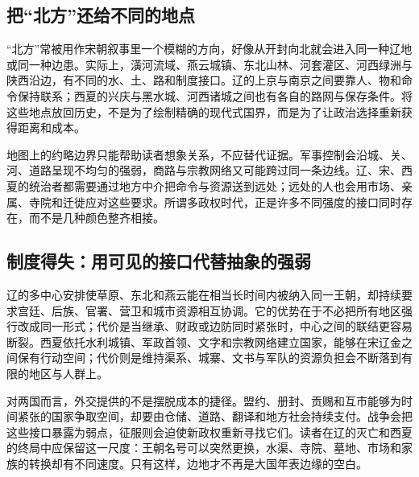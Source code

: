 \subsection{把“北方”还给不同的地点}

“北方”常被用作宋朝叙事里一个模糊的方向，好像从开封向北就会进入同一种辽地或同一种边患。实际上，潢河流域、燕云城镇、东北山林、河套灌区、河西绿洲与陕西沿边，有不同的水、土、路和制度接口。辽的上京与南京之间要靠人、物和命令保持联系；西夏的兴庆与黑水城、河西诸城之间也有各自的路网与保存条件。将这些地点放回历史，不是为了绘制精确的现代式国界，而是为了让政治选择重新获得距离和成本。

地图上的约略边界只能帮助读者想象关系，不应替代证据。军事控制会沿城、关、河、道路呈现不均匀的强弱，商路与宗教网络又可能跨过同一条边线。辽、宋、西夏的统治者都需要通过地方中介把命令与资源送到远处；远处的人也会用市场、亲属、寺院和迁徙应对这些要求。所谓多政权时代，正是许多不同强度的接口同时存在，而不是几种颜色整齐相接。

\subsection{制度得失：用可见的接口代替抽象的强弱}

辽的多中心安排使草原、东北和燕云能在相当长时间内被纳入同一王朝，却持续要求宫廷、后族、官署、营卫和城市资源相互协调。它的优势在于不必把所有地区强行改成同一形式；代价是当继承、财政或边防同时紧张时，中心之间的联结更容易断裂。西夏依托水利城镇、军政首领、文字和宗教网络建立国家，能够在宋辽金之间保有行动空间；代价则是维持渠系、城寨、文书与军队的资源负担会不断落到有限的地区与人群上。

对两国而言，外交提供的不是摆脱成本的捷径。盟约、册封、贡赐和互市能够为时间紧张的国家争取空间，却要由仓储、道路、翻译和地方社会持续支付。战争会把这些接口暴露为弱点，征服则会迫使新政权重新寻找它们。读者在辽的灭亡和西夏的终局中应保留这一尺度：王朝名号可以突然更换，水渠、寺院、墓地、市场和家族的转换却有不同速度。只有这样，边地才不再是大国年表边缘的空白。
